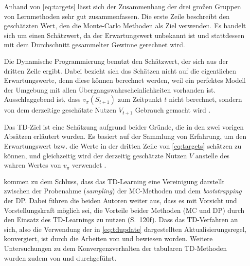 Anhand von \ref{eq:targets} lässt sich der Zusammenhang der drei großen Gruppen von Lernmethoden sehr gut zusammenfassen. Die erste Zeile beschreibt den geschätzten Wert, den die Monte-Carlo Methoden als Ziel verwenden. Es handelt sich um einen Schätzwert, da der Erwartungswert unbekannt ist und stattdessen mit dem Durchschnitt gesammelter Gewinne gerechnet wird. 
\par 
Die Dynamische Programmierung benutzt den Schätzwert, der sich aus der dritten Zeile ergibt. Dabei bezieht sich das Schätzen nicht auf die eigentlichen Erwartungswerte, denn diese können berechnet werden, weil ein perfektes Modell der Umgebung mit allen Übergangswahrscheinlichkeiten vorhanden ist. Ausschlaggebend ist, dass $v_\pi(S_{t+1})$ zum Zeitpunkt $t$ nicht berechnet, sondern von dem derzeitige geschätzte Nutzen $V_{t+1}$ Gebrauch gemacht wird \cite[S.~120]{Sutton1998}.
\par 
Das TD-Ziel ist eine Schätzung aufgrund beider Gründe, die in den zwei vorigen Absätzen erläutert wurden. Es basiert auf der Sammlung von Erfahrung, um den Erwartungswert bzw. die Werte in der dritten Zeile von \ref{eq:targets} schätzen zu können, und gleichzeitig wird der derzeitig geschätzte Nutzen $V$ anstelle des wahren Wertes von $v_\pi$ verwendet \cite[S.~120f]{Sutton1998}.
\par
\cite{Sutton1998} kommen zu dem Schluss, dass das TD-Learning eine Vereinigung darstellt zwischen der Probenahme (\textit{sampling}) der MC-Methoden und dem \textit{bootstrapping} der DP. Dabei führen die beiden Autoren weiter aus, dass es mit \glqq Vorsicht und Vorstellungskraft\grqq{} möglich sei, die Vorteile beider Methoden (MC und DP) durch den Einsatz des TD-Learnings zu nutzen (S.~120f).
\newpage
Dass das TD-Verfahren an sich, also die Verwendung der in \ref{eq:tdupdate} dargestellten Aktualisierungsregel, konvergiert, ist durch die Arbeiten von \cite{sutton1988TD} und \cite{dayan} bewiesen worden. Weitere Untersuchungen zu dem Konvergenzverhalten der tabularen TD-Methoden wurden zudem von \cite{jaakkola1994convergence} und \cite{tsitsiklis1994asynchronous} durchgeführt.

